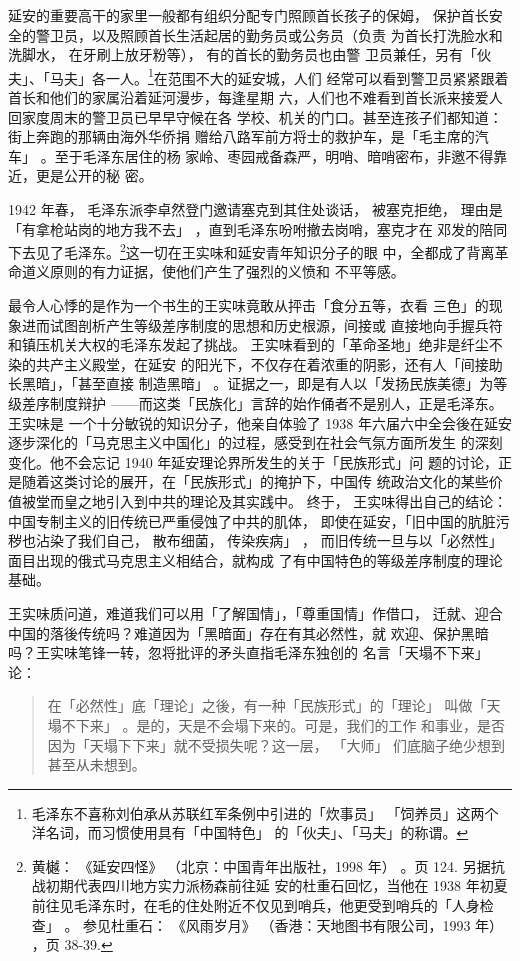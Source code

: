 延安的重要高干的家里一般都有组织分配专门照顾首长孩子的保姆，
保护首长安全的警卫员，以及照顾首长生活起居的勤务员或公务员（负责
为首长打洗脸水和洗脚水，
在牙刷上放牙粉等）， 有的首长的勤务员也由警
卫员兼任，另有「伙夫」、「马夫」各一人。\footnote{毛泽东不喜称刘伯承从苏联红军条例中引进的「炊事员」
「饲养员」这两个洋名词，而习惯使用具有「中国特色」
的「伙夫」、「马夫」的称谓。}在范围不大的延安城，人们
经常可以看到警卫员紧紧跟着首长和他们的家属沿着延河漫步，每逢星期
六，人们也不难看到首长派来接爱人回家度周末的警卫员已早早守候在各
学校、机关的门口。甚至连孩子们都知道：街上奔跑的那辆由海外华侨捐
赠给八路军前方将士的救护车，是「毛主席的汽车」
。至于毛泽东居住的杨
家岭、枣园戒备森严，明哨、暗哨密布，非邀不得靠近，更是公开的秘
密。

1942 年春，
毛泽东派李卓然登门邀请塞克到其住处谈话，
被塞克拒绝，
理由是「有拿枪站岗的地方我不去」
，直到毛泽东吩咐撤去岗哨，塞克才在
邓发的陪同下去见了毛泽东。\footnote{黄樾：
《延安四怪》
（北京：中国青年出版社，1998 年）
。页 124. 另据抗战初期代表四川地方实力派杨森前往延
安的杜重石回忆，当他在 1938 年初夏前往见毛泽东时，在毛的住处附近不仅见到哨兵，他更受到哨兵的「人身检查」
。
参见杜重石：
《风雨岁月》
（香港：天地图书有限公司，1993 年）
，页 38-39. 
}这一切在王实味和延安青年知识分子的眼
中，全都成了背离革命道义原则的有力证据，使他们产生了强烈的义愤和
不平等感。

最令人心悸的是作为一个书生的王实味竟敢从抨击「食分五等，衣看
三色」的现象进而试图剖析产生等级差序制度的思想和历史根源，间接或
直接地向手握兵符和镇压机关大权的毛泽东发起了挑战。
王实味看到的「革命圣地」绝非是纤尘不染的共产主义殿堂，在延安
的阳光下，不仅存在着浓重的阴影，还有人「间接助长黑暗」，「甚至直接
制造黑暗」
。证据之一，即是有人以「发扬民族美德」为等级差序制度辩护
——而这类「民族化」言辞的始作俑者不是别人，正是毛泽东。王实味是
一个十分敏锐的知识分子，他亲自体验了 1938 年六届六中全会後在延安
逐步深化的「马克思主义中国化」的过程，感受到在社会气氛方面所发生
的深刻变化。他不会忘记 1940 年延安理论界所发生的关于「民族形式」问
题的讨论，正是随着这类讨论的展开，在「民族形式」的掩护下，中国传
统政治文化的某些价值被堂而皇之地引入到中共的理论及其实践中。
终于，
王实味得出自己的结论：
中国专制主义的旧传统已严重侵蚀了中共的肌体，
即使在延安，「旧中国的肮脏污秽也沾染了我们自己，
散布细菌，
传染疾病」
，
而旧传统一旦与以「必然性」面目出现的俄式马克思主义相结合，就构成
了有中国特色的等级差序制度的理论基础。

王实味质问道，难道我们可以用「了解国情」，「尊重国情」作借口，
迁就、迎合中国的落後传统吗？难道因为「黑暗面」存在有其必然性，就
欢迎、保护黑暗吗？王实味笔锋一转，忽将批评的矛头直指毛泽东独创的
名言「天塌不下来」论：
\begin{quote}
	
{\fzwkai 在「必然性」底「理论」之後，有一种「民族形式」的「理论」
叫做「天塌不下来」
。是的，天是不会塌下来的。可是，我们的工作
和事业，是否因为「天塌下下来」就不受损失呢？这一层，
「大师」
们底脑子绝少想到甚至从未想到。}
\end{quote}

